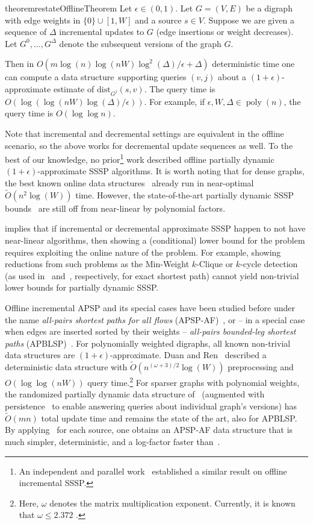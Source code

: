 \documentclass[11pt,letterpaper]{article}
\theoremstyle{plain}
\def\poly{\operatorname{poly}}
\renewcommand{\O}{O}
\newcommand{\Ot}{\ensuremath{\widetilde{\O}}}
\newcommand{\eps}{\ensuremath{\epsilon}}
\newcommand{\dist}{\mathrm{dist}}
\begin{document}
\begin{restatable}[]{theorem}{restateOfflineTheorem}\label{t:offline}
Let $\eps\in (0,1)$. Let $G=(V,E)$ be a digraph with edge weights in $\{0\}\cup [1,W]$ and a source $s\in V$.
Suppose we are given a sequence of $\Delta$ incremental updates to $G$ (edge insertions or weight decreases). Let $G^0,\ldots,G^\Delta$ denote the subsequent versions of the graph $G$.

Then in
$\O(m \log(n)\log(nW) \log^2(\Delta) / \eps + \Delta)$
deterministic time one can compute a data structure~supporting queries $(v,j)$ about a $(1+\eps)$-approximate estimate of $\dist_{G^j}(s,v)$. The query time is $\O(\log(\log(nW)\log(\Delta)/\eps))$.
For example, if $\eps,W,\Delta\in \poly(n)$, the query time is $O(\log\log{n})$.
\end{restatable}
Note that incremental and decremental settings are equivalent in the offline scenario, so the above works for decremental update sequences as well.
To the best of our knowledge, no prior\footnote{An independent and parallel work~\cite{arxiv-independent} established a similar result on offline incremental SSSP.}  work described offline partially dynamic $(1+\eps)$-approximate SSSP algorithms. It is worth noting that for dense graphs, the best known online data structures~\cite{BernsteinGW20, GutenbergWW20} already run in near-optimal $\Ot(n^2\log(W))$ time.
However, the state-of-the-art partially dynamic SSSP bounds~\cite{BernsteinGW20, KyngMG22, GutenbergWW20} are still off from near-linear by polynomial factors.

 implies that if incremental or decremental approximate SSSP happen to not have near-linear algorithms, then showing a (conditional) lower bound for the problem requires exploiting the online nature of the problem.
For example, showing reductions from such problems as the Min-Weight $k$-Clique or $k$-cycle detection (as used in~\cite{SahaWX025} and~\cite{GutenbergWW20}, respectively, for exact shortest path) cannot yield non-trivial lower bounds for partially dynamic SSSP.

Offline incremental APSP and its special cases have been studied before under the name \emph{all-pairs shortest paths for all flows} (APSP-AF)~\cite{DuanR18, ShinnT14}, or -- in a special case when edges are inserted sorted by their weights -- \emph{all-pairs bounded-leg shortest paths} (APBLSP)~\cite{BoseMNSZ04, DuanP08, RodittyS11}.
For polynomially weighted digraphs, all known non-trivial data structures are $(1+\eps)$-approximate.
Duan and Ren~\cite{DuanR18} described a deterministic data structure with $\Ot(n^{(\omega+3)/2}\log(W))$ preprocessing and $O(\log\log(nW))$ query time.\footnote{Here, $\omega$ denotes the matrix multiplication exponent. Currently, it is known that $\omega\leq 2.372$ \cite{AlmanDWXXZ25}.}
For sparser graphs with polynomial weights, the randomized partially dynamic data structure of~\cite{Bernstein16} (augmented with persistence~\cite{DriscollSST89} to enable answering queries about individual graph's versions) has $\Ot(mn)$ total update time and remains the state of the art, also for APBLSP.
By applying~ for each source, one obtains an APSP-AF data structure that is much simpler, deterministic, and a log-factor faster than~\cite{Bernstein16}.
\end{document}
